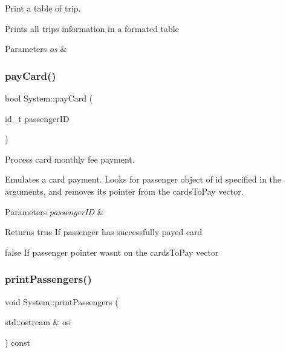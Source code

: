 Print a table of trip. 

Prints all trips\textquotesingle{} information in a formated table


\begin{DoxyParams}{Parameters}
{\em os} & \\
\hline
\end{DoxyParams}
\mbox{\label{classSystem_ae5df9c6b2309272f8642cb16dbe5132e}} 
\subsubsection{\texorpdfstring{pay\+Card()}{payCard()}}
{\footnotesize\ttfamily bool System\+::pay\+Card (\begin{DoxyParamCaption}\item[{id\+\_\+t}]{passenger\+ID }\end{DoxyParamCaption})}



Process card monthly fee payment. 

Emulates a card payment. Looks for passenger object of id specified in the arguments, and removes it\textquotesingle{}s pointer from the cards\+To\+Pay vector.


\begin{DoxyParams}{Parameters}
{\em passenger\+ID} & \\
\hline
\end{DoxyParams}
\begin{DoxyReturn}{Returns}
true If passenger has successfully payed card 

false If passenger pointer wasn\textquotesingle{}t on the cards\+To\+Pay vector 
\end{DoxyReturn}
\mbox{\label{classSystem_a1c5753d5c70d15dc3fe56fd5e421ba76}} 
\subsubsection{\texorpdfstring{print\+Passengers()}{printPassengers()}}
{\footnotesize\ttfamily void System\+::print\+Passengers (\begin{DoxyParamCaption}\item[{std\+::ostream \&}]{os }\end{DoxyParamCaption}) const}



